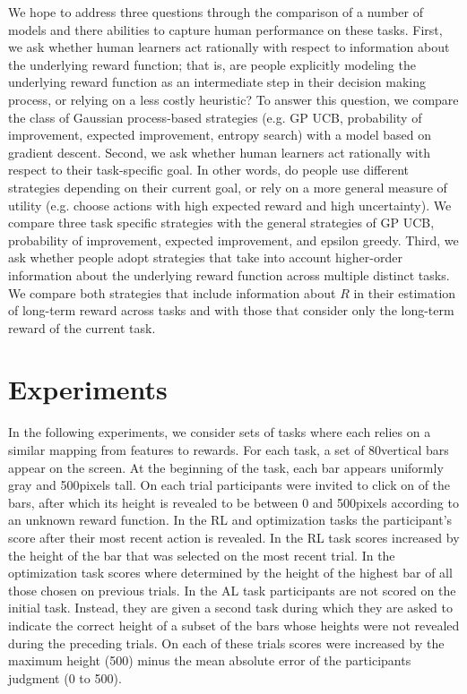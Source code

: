 \documentclass[10pt,letterpaper]{article}
\def\numbars{80}
\def\maxheight{500}
\begin{document}
	We hope to address three questions through the comparison of a number of models and there abilities to capture human performance on these tasks. First, we ask whether human learners act rationally with respect to information about the underlying reward function; that is, are people explicitly modeling the underlying reward function as an intermediate step in their decision making process, or relying on a less costly heuristic? To answer this question, we compare the class of Gaussian process-based strategies (e.g. GP UCB, probability of improvement, expected improvement, entropy search) with a model based on gradient descent. Second, we ask whether human learners act rationally with respect to their task-specific goal. In other words, do people use different strategies depending on their current goal, or rely on a more general measure of utility (e.g. choose actions with high expected reward and high uncertainty). We compare three task specific strategies with the general strategies of GP UCB, probability of improvement, expected improvement, and epsilon greedy. Third, we ask whether people adopt strategies that take into account higher-order information about the underlying reward function across multiple distinct tasks. We compare both strategies that include information about $R$ in their estimation of long-term reward across tasks and with those that consider only the long-term reward of the current task.
	
	\section{Experiments}
	
	In the following experiments, we consider sets of tasks where each relies on a similar mapping from features to rewards. For each task, a set of \numbars \space vertical bars appear on the screen. At the beginning of the task, each bar appears uniformly gray and \maxheight \space pixels tall. On each trial participants were invited to click on of the bars, after which its height is revealed to be between 0 and \maxheight \space pixels according to an unknown reward function. In the RL and optimization tasks the participant's score after their most recent action is revealed. In the RL task scores increased by the height of the bar that was selected on the most recent trial. In the optimization task scores where determined by the height of the highest bar of all those chosen on previous trials. In the AL task participants are not scored on the initial task. Instead, they are given a second task during which they are asked to indicate the correct height of a subset of the bars whose heights were not revealed during the preceding trials. On each of these trials scores were increased by the maximum height (\maxheight) minus the mean absolute error of the participants judgment (0 to \maxheight).
	
\end{document}

